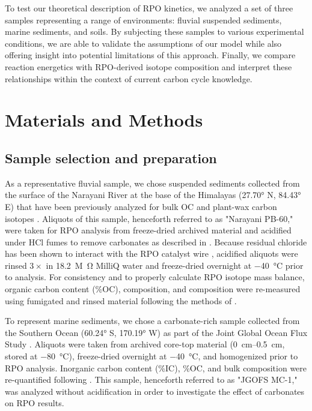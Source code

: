 To test our theoretical description of RPO kinetics, we analyzed a set of three samples representing a range of environments: fluvial suspended sediments, marine sediments, and soils. By subjecting these samples to various experimental conditions, we are able to validate the assumptions of our model while also offering insight into potential limitations of this approach. Finally, we compare reaction energetics with RPO-derived isotope composition and interpret these relationships within the context of current carbon cycle knowledge.

\section{Materials and Methods}

\subsection{Sample selection and preparation}

As a representative fluvial sample, we chose suspended sediments collected from the surface of the Narayani River at the base of the Himalayas (\ang{27.70} N, \ang{84.43} E) that have been previously analyzed for bulk OC and plant-wax carbon isotopes \citep{Galy:2008jw,Galy:2011hk,Galy:2011ix}. Aliquots of this sample, henceforth referred to as "Narayani PB-60," were taken for RPO analysis from freeze-dried archived material and acidified under HCl fumes to remove carbonates as described in \citet{Whiteside:2011jea}. Because residual chloride has been shown to interact with the RPO catalyst wire \citep{Hemingway:2016rc}, acidified aliquots were rinsed $3\times$ in \SI{18.2}{M \ohm} MilliQ water and freeze-dried overnight at \SI{-40}{\celsius} prior to analysis. For consistency and to properly calculate RPO isotope mass balance, organic carbon content (\%OC),  composition, and  composition were re-measured using fumigated and rinsed material following the methods of \citet{McNichol:1994dt,McNichol:1994ty}.

To represent marine sediments, we chose a carbonate-rich sample collected from the Southern Ocean (\ang{60.24} S, \ang{170.19} W) as part of the Joint Global Ocean Flux Study \citep[JGOFS;][]{Sayles:2001ua}. Aliquots were taken from archived core-top material (\SIrange{0}{0.5}{cm}, stored at \SI{-80}{\celsius}), freeze-dried overnight at \SI{-40}{\celsius}, and homogenized prior to RPO analysis. Inorganic carbon content (\%IC), \%OC, and bulk  composition were re-quantified following \citet{McNichol:1994dt}. This sample, henceforth referred to as "JGOFS MC-1," was analyzed without acidification in order to investigate the effect of carbonates on RPO results.

